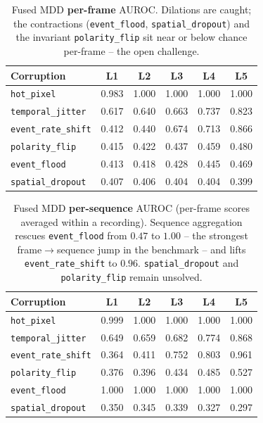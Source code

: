 \begin{table}[t]
  \centering\small
  \begin{tabular}{lccccc}
    \toprule
    Corruption & L1 & L2 & L3 & L4 & L5 \\
    \midrule
    \texttt{hot\_pixel}        & 0.983 & 1.000 & 1.000 & 1.000 & 1.000 \\
    \texttt{temporal\_jitter}  & 0.617 & 0.640 & 0.663 & 0.737 & 0.823 \\
    \texttt{event\_rate\_shift}& 0.412 & 0.440 & 0.674 & 0.713 & 0.866 \\
    \texttt{polarity\_flip}    & 0.415 & 0.422 & 0.437 & 0.459 & 0.480 \\
    \texttt{event\_flood}      & 0.413 & 0.418 & 0.428 & 0.445 & 0.469 \\
    \texttt{spatial\_dropout}  & 0.407 & 0.406 & 0.404 & 0.404 & 0.399 \\
    \bottomrule
  \end{tabular}
  \caption{Fused MDD \textbf{per-frame} AUROC. Dilations are caught; the contractions
  (\texttt{event\_flood}, \texttt{spatial\_dropout}) and the invariant \texttt{polarity\_flip}
  sit near or below chance per-frame -- the open challenge.}
  \label{tab:mdd-frame}
\end{table}

\begin{table}[t]
  \centering\small
  \begin{tabular}{lccccc}
    \toprule
    Corruption & L1 & L2 & L3 & L4 & L5 \\
    \midrule
    \texttt{hot\_pixel}        & 0.999 & 1.000 & 1.000 & 1.000 & 1.000 \\
    \texttt{temporal\_jitter}  & 0.649 & 0.659 & 0.682 & 0.774 & 0.868 \\
    \texttt{event\_rate\_shift}& 0.364 & 0.411 & 0.752 & 0.803 & 0.961 \\
    \texttt{polarity\_flip}    & 0.376 & 0.396 & 0.434 & 0.485 & 0.527 \\
    \texttt{event\_flood}      & 1.000 & 1.000 & 1.000 & 1.000 & 1.000 \\
    \texttt{spatial\_dropout}  & 0.350 & 0.345 & 0.339 & 0.327 & 0.297 \\
    \bottomrule
  \end{tabular}
  \caption{Fused MDD \textbf{per-sequence} AUROC (per-frame scores averaged within a
  recording). Sequence aggregation rescues \texttt{event\_flood} from $0.47$ to $\mathbf{1.00}$
  -- the strongest frame$\to$sequence jump in the benchmark -- and lifts
  \texttt{event\_rate\_shift} to $0.96$. \texttt{spatial\_dropout} and \texttt{polarity\_flip}
  remain unsolved.}
  \label{tab:mdd-seq}
\end{table}

